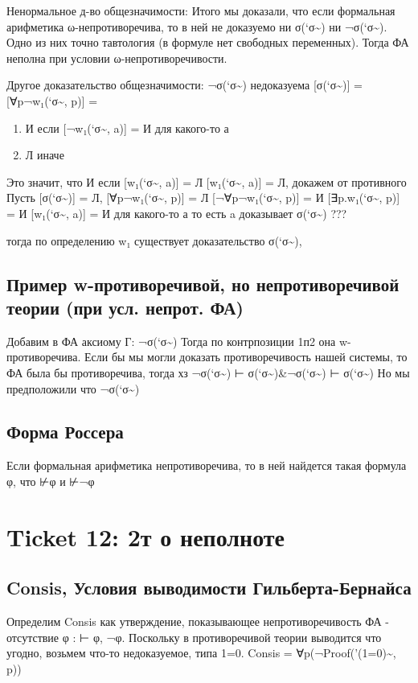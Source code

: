 \documentclass[11pt]{article}
\begin{document}
Ненормальное д-во общезначимости:
Итого мы доказали, что если формальная арифметика ω-непротиворечива,
то в ней не доказуемо ни σ(`σ\textasciitilde{}) ни ¬σ(`σ\textasciitilde{}). Одно из них точно тавтология
(в формуле нет свободных переменных). Тогда ФА неполна при условии
ω-непротиворечивости.

Другое доказательство общезначимости:
¬σ(`σ\textasciitilde{}) недоказуема
[σ(`σ\textasciitilde{})] = [∀p¬w₁(`σ\textasciitilde{}, p)] =
\begin{enumerate}
\item И если [¬w₁(`σ\textasciitilde{}, a)] = И для какого-то а
\item Л иначе
\end{enumerate}

Это значит, что
И если [w₁(`σ\textasciitilde{}, a)] = Л
[w₁(`σ\textasciitilde{}, a)] = Л, докажем от противного
Пусть [σ(`σ\textasciitilde{})] = Л,
[∀p¬w₁(`σ\textasciitilde{}, p)] = Л
[¬∀p¬w₁(`σ\textasciitilde{}, p)] = И
[∃p.w₁(`σ\textasciitilde{}, p)] = И
[w₁(`σ\textasciitilde{}, a)] = И для какого-то а
то есть a доказывает σ(`σ\textasciitilde{})
???

тогда по определению w₁ существует
доказательство σ(`σ\textasciitilde{}),
\subsection{Пример w-противоречивой, но непротиворечивой теории (при усл. непрот. ФА)}
\label{sec-13-3}
Добавим в ФА аксиому Г: ¬σ(`σ\textasciitilde{})
Тогда по контрпозиции 1п2 она w-противоречива.
Если бы мы могли доказать противоречивость нашей системы, то
ФА была бы противоречива, тогда хз
¬σ(`σ\textasciitilde{}) ⊢ σ(`σ\textasciitilde{})\&¬σ(`σ\textasciitilde{})
⊢ σ(`σ\textasciitilde{})
Но мы предположили что ¬σ(`σ\textasciitilde{})
\subsection{Форма Россера}
\label{sec-13-4}
Если формальная арифметика непротиворечива, то в ней найдется
такая формула φ, что ⊬φ и ⊬¬φ
\section{Ticket 12: 2т о неполноте}
\label{sec-14}
\subsection{Consis, Условия выводимости Гильберта-Бернайса}
\label{sec-14-1}
Определим Consis как утверждение, показывающее
непротиворечивость ФА - отсутствие φ : ⊢ φ, ¬φ. Поскольку
в противоречивой теории выводится что угодно, возьмем что-то
недоказуемое, типа 1=0.
Consis = ∀p(¬Proof('(1=0)\textasciitilde{}, p))
\end{document}
